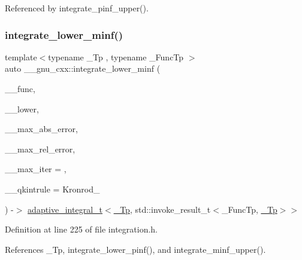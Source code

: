 Referenced by integrate\+\_\+pinf\+\_\+upper().

\mbox{\label{namespace____gnu__cxx_a2a1c7fcbb716c0f1f8f93ce3893b564a}} 
\subsubsection{\texorpdfstring{integrate\+\_\+lower\+\_\+minf()}{integrate\_lower\_minf()}}
{\footnotesize\ttfamily template$<$typename \+\_\+\+Tp , typename \+\_\+\+Func\+Tp $>$ \\
auto \+\_\+\+\_\+gnu\+\_\+cxx\+::integrate\+\_\+lower\+\_\+minf (\begin{DoxyParamCaption}\item[{\+\_\+\+Func\+Tp}]{\+\_\+\+\_\+func,  }\item[{\hyperlink{namespace____gnu__cxx_a3b19a9c800ca194374ef9172290f7d79}{\+\_\+\+Tp}}]{\+\_\+\+\_\+lower,  }\item[{\hyperlink{namespace____gnu__cxx_a3b19a9c800ca194374ef9172290f7d79}{\+\_\+\+Tp}}]{\+\_\+\+\_\+max\+\_\+abs\+\_\+error,  }\item[{\hyperlink{namespace____gnu__cxx_a3b19a9c800ca194374ef9172290f7d79}{\+\_\+\+Tp}}]{\+\_\+\+\_\+max\+\_\+rel\+\_\+error,  }\item[{std\+::size\+\_\+t}]{\+\_\+\+\_\+max\+\_\+iter = {},  }\item[{Kronrod\+\_\+\+Rule}]{\+\_\+\+\_\+qkintrule = {\ttfamily Kronrod\+\_} }\end{DoxyParamCaption}) -\/$>$ \hyperlink{struct____gnu__cxx_1_1adaptive__integral__t}{adaptive\+\_\+integral\+\_\+t}$<$\hyperlink{namespace____gnu__cxx_a3b19a9c800ca194374ef9172290f7d79}{\+\_\+\+Tp}, std\+::invoke\+\_\+result\+\_\+t$<$\+\_\+\+Func\+Tp, \hyperlink{namespace____gnu__cxx_a3b19a9c800ca194374ef9172290f7d79}{\+\_\+\+Tp}$>$$>$
    \hspace{0.3cm}{\ttfamily [inline]}}



Definition at line 225 of file integration.\+h.



References \+\_\+\+Tp, integrate\+\_\+lower\+\_\+pinf(), and integrate\+\_\+minf\+\_\+upper().


